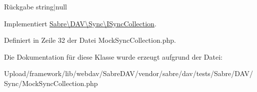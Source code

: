 \begin{DoxyReturn}{Rückgabe}
string$\vert$null 
\end{DoxyReturn}


Implementiert \mbox{\hyperlink{interface_sabre_1_1_d_a_v_1_1_sync_1_1_i_sync_collection_ae8b002d4a88dc34170f9468b5009e08f}{Sabre\textbackslash{}\+D\+A\+V\textbackslash{}\+Sync\textbackslash{}\+I\+Sync\+Collection}}.



Definiert in Zeile 32 der Datei Mock\+Sync\+Collection.\+php.



Die Dokumentation für diese Klasse wurde erzeugt aufgrund der Datei\+:\begin{DoxyCompactItemize}
\item 
Upload/framework/lib/webdav/\+Sabre\+D\+A\+V/vendor/sabre/dav/tests/\+Sabre/\+D\+A\+V/\+Sync/Mock\+Sync\+Collection.\+php\end{DoxyCompactItemize}
